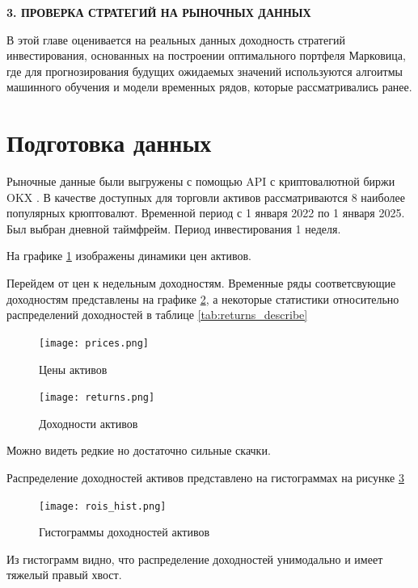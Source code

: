 \newpage
\begin{center}
	\textbf{\large 3. ПРОВЕРКА СТРАТЕГИЙ НА РЫНОЧНЫХ ДАННЫХ}
\end{center}

В этой главе оценивается на реальных данных доходность стратегий инвестирования, основанных на построении оптимального портфеля Марковица,
где для прогнозирования будущих ожидаемых значений используются алгоитмы машинного обучения и модели временных рядов, 
которые рассматривались ранее.


\section{Подготовка данных}

Рыночные данные были выгружены с помощью API с криптовалютной биржи OKX \cite{okx}.
В качестве доступных для торговли активов рассматриваются 8 наиболее популярных крюптовалют.
Временной период с 1 января 2022 по  1 января 2025.
Был выбран дневной таймфрейм.
Период инвестирования 1 неделя.

На графике \ref{fig:prices} изображены динамики цен активов.

Перейдем от цен к недельным доходностям. Временные ряды соответсвующие доходностям 
представлены на графике \ref{fig:returns}, а некоторые статистики относительно распределений
доходностей в таблице \ref{tab:returns_describe}



\begin{figure}[H]
	\centering
	\texttt{[image: prices.png]}
	\caption{Цены активов}
	\label{fig:prices}
\end{figure}

\begin{figure}[H]
	\centering
	\texttt{[image: returns.png]}
	\caption{Доходности активов}
	\label{fig:returns}
\end{figure}
Можно видеть редкие но достаточно сильные скачки.

Распределение доходностей активов представлено на гистограммах на рисунке \ref{fig:rois_hist}

\begin{figure}[H]
	\centering
	\texttt{[image: rois\_hist.png]}
	\caption{Гистограммы доходностей активов}
	\label{fig:rois_hist}
\end{figure}

Из гистограмм видно, что распределение доходностей унимодально и имеет тяжелый правый хвост.


